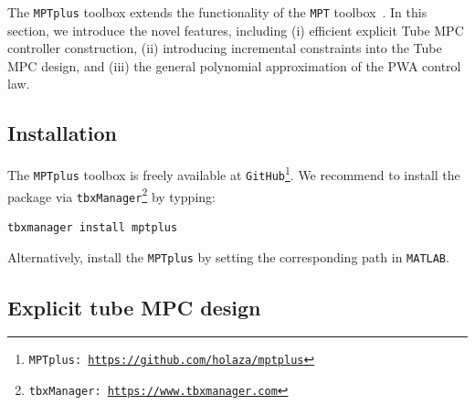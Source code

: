 \documentclass[letterpaper, 10 pt, conference]{ieeeconf}
\begin{document}


The \texttt{MPTplus} toolbox extends the functionality of the \texttt{MPT} toolbox~\cite{MPT3}. In this section, we introduce the novel features, including (i) efficient explicit Tube MPC controller construction, (ii) introducing incremental constraints into the Tube MPC design, and (iii) the general polynomial approximation of the PWA control law. 

\subsection{Installation}
\label{sec:installation}

The \texttt{MPTplus} toolbox is freely available at \texttt{GitHub}\footnote{\texttt{MPTplus: \url{https://github.com/holaza/mptplus}}}. We recommend to install the package via \texttt{tbxManager}\footnote{\texttt{tbxManager: \url{https://www.tbxmanager.com}}} by typping:
\begin{lstlisting}[style=Matlab-editor]
	tbxmanager install mptplus
\end{lstlisting}
Alternatively, install the \texttt{MPTplus} by setting the corresponding path in \texttt{MATLAB}. 


\subsection{Explicit tube MPC design}
\label{sec:mptplus_tube_mpc}
\end{document}
